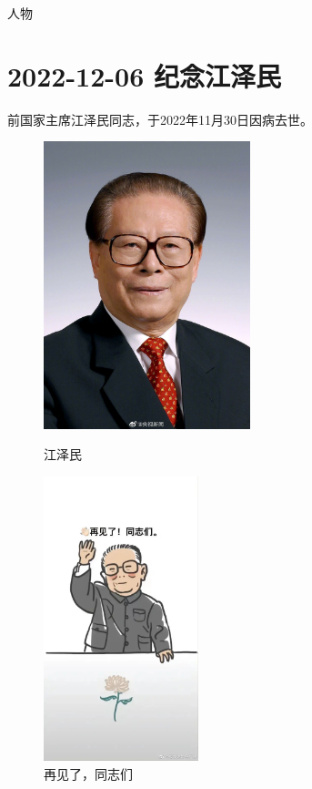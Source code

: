 \begin{taged}{人物}
\section{2022-12-06 纪念江泽民}
\end{taged}

前国家主席江泽民同志，于2022年11月30日因病去世。

\begin{figure}[htbp]
    \centering
    \begin{minipage}{6cm}
        \centering
        \includegraphics[width=6cm]{pic/江泽民.jpg}
        \caption*{江泽民}
    \end{minipage}
    \quad
    \begin{minipage}{6cm}
        \centering
        \includegraphics[width=4.5cm]{pic/再见了，同志们.jpg}
        \caption*{再见了，同志们}
    \end{minipage}
\end{figure}

